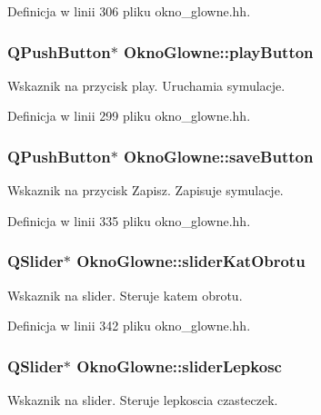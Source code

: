 Definicja w linii 306 pliku okno\-\_\-glowne.\-hh.

\hypertarget{class_okno_glowne_a50f936486c1bc3b3278823a8eb90841e}{
\subsubsection[{play\-Button}]{\setlength{\rightskip}{0pt plus 5cm}Q\-Push\-Button$\ast$ Okno\-Glowne\-::play\-Button\hspace{0.3cm}{\ttfamily [private]}}}\label{class_okno_glowne_a50f936486c1bc3b3278823a8eb90841e}
Wskaznik na przycisk play. Uruchamia symulacje. 

Definicja w linii 299 pliku okno\-\_\-glowne.\-hh.

\hypertarget{class_okno_glowne_a81e6650fa592f04bf0adc3bebd3346d6}{
\subsubsection[{save\-Button}]{\setlength{\rightskip}{0pt plus 5cm}Q\-Push\-Button$\ast$ Okno\-Glowne\-::save\-Button\hspace{0.3cm}{\ttfamily [private]}}}\label{class_okno_glowne_a81e6650fa592f04bf0adc3bebd3346d6}
Wskaznik na przycisk Zapisz. Zapisuje symulacje. 

Definicja w linii 335 pliku okno\-\_\-glowne.\-hh.

\hypertarget{class_okno_glowne_aaee43ea7074cff126b069c60657d698d}{
\subsubsection[{slider\-Kat\-Obrotu}]{\setlength{\rightskip}{0pt plus 5cm}Q\-Slider$\ast$ Okno\-Glowne\-::slider\-Kat\-Obrotu\hspace{0.3cm}{\ttfamily [private]}}}\label{class_okno_glowne_aaee43ea7074cff126b069c60657d698d}
Wskaznik na slider. Steruje katem obrotu. 

Definicja w linii 342 pliku okno\-\_\-glowne.\-hh.

\hypertarget{class_okno_glowne_ae2f07f3f6c3f8286a943b42860299072}{
\subsubsection[{slider\-Lepkosc}]{\setlength{\rightskip}{0pt plus 5cm}Q\-Slider$\ast$ Okno\-Glowne\-::slider\-Lepkosc\hspace{0.3cm}{\ttfamily [private]}}}\label{class_okno_glowne_ae2f07f3f6c3f8286a943b42860299072}
Wskaznik na slider. Steruje lepkoscia czasteczek. 

